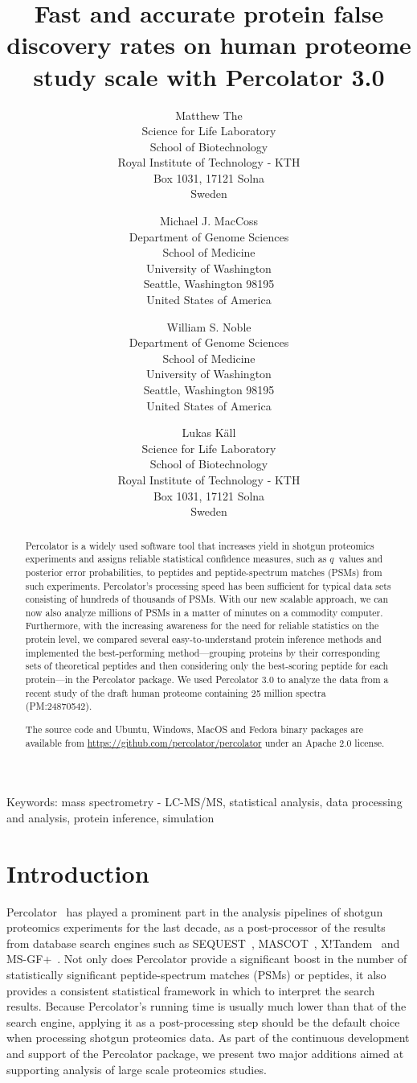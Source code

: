 \documentclass{article}
\title{Fast and accurate protein false discovery rates on human
proteome study scale with Percolator 3.0}
\author{Matthew The\\
Science for Life Laboratory\\
School of Biotechnology\\
Royal Institute of Technology - KTH\\
Box 1031, 17121 Solna\\ Sweden
\and 
Michael J. MacCoss\\
Department of Genome Sciences\\
School of Medicine\\
University of Washington\\
Seattle, Washington 98195\\
United States of America
\and 
William S. Noble\\
Department of Genome Sciences\\
School of Medicine\\
University of Washington\\
Seattle, Washington 98195\\
United States of America
\and
Lukas K\"{a}ll\\
Science for Life Laboratory\\
School of Biotechnology\\
Royal Institute of Technology - KTH\\ 
Box 1031, 17121 Solna\\ Sweden}
\begin{document}
\maketitle

\doublespacing

Keywords: mass spectrometry - LC-MS/MS, statistical analysis, 
data processing and analysis, protein inference, simulation


\newpage

\begin{abstract} 

Percolator is a widely used software tool that increases yield in
shotgun proteomics experiments and assigns reliable statistical
confidence measures, such as $q$~values and posterior error
probabilities, to peptides and peptide-spectrum matches (PSMs) from
such experiments. Percolator's processing speed has been sufficient
for typical data sets consisting of hundreds of thousands of
PSMs. With our new scalable approach, we can now also analyze millions
of PSMs in a matter of minutes on a commodity computer.  Furthermore,
with the increasing awareness for the need for reliable statistics on
the protein level, we compared several easy-to-understand protein
inference methods and implemented the best-performing
method---grouping proteins by their corresponding sets of theoretical
peptides and then considering only the best-scoring peptide for each
protein---in the Percolator package. We used Percolator 3.0 to analyze
the data from a recent study of the draft human proteome containing 25
million spectra (PM:24870542).

The source code and Ubuntu, Windows, MacOS and Fedora binary packages
are available from \url{https://github.com/percolator/percolator}
under an Apache 2.0 license.
\end{abstract}

\newpage

\section*{Introduction}

Percolator~\cite{kall2007} has played a prominent part in the analysis
pipelines of shotgun proteomics experiments for the last decade, as a
post-processor of the results from database search engines such as
SEQUEST~\cite{eng1994}, MASCOT~\cite{cottrell1999},
X!Tandem~\cite{craig2004tandem} and MS-GF+~\cite{kim2008}. Not only
does Percolator provide a significant boost in the number of
statistically significant peptide-spectrum matches (PSMs) or peptides,
it also provides a consistent statistical framework in which to
interpret the search results. Because Percolator's running time is
usually much lower than that of the search engine, applying it as a
post-processing step should be the default choice when processing
shotgun proteomics data. As part of the continuous development and
support of the Percolator package, we present two major additions
aimed at supporting analysis of large scale proteomics studies.
\end{document}
